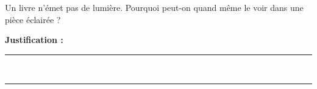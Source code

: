 Un livre n'émet pas de lumière. Pourquoi peut-on quand même le voir dans une pièce éclairée ?

\choices

\noindent\textbf{Justification :} \hrulefill \\[2.5ex]
\rule{\linewidth}{0.4pt} \\[2.5ex]
\rule{\linewidth}{0.4pt}
\vfill
